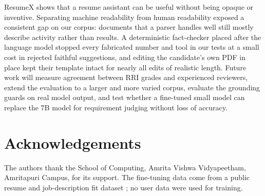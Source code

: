 \documentclass[3p,times,procedia]{elsarticle}
\begin{document}
ResumeX shows that a resume assistant can be useful without being opaque or inventive. Separating machine readability from human readability exposed a consistent gap on our corpus: documents that a parser handles well still mostly describe activity rather than results. A deterministic fact-checker placed after the language model stopped every fabricated number and tool in our tests at a small cost in rejected faithful suggestions, and editing the candidate's own PDF in place kept their template intact for nearly all edits of realistic length. Future work will measure agreement between RRI grades and experienced reviewers, extend the evaluation to a larger and more varied corpus, evaluate the grounding guards on real model output, and test whether a fine-tuned small model can replace the 7B model for requirement judging without loss of accuracy.

\section*{Acknowledgements}

The authors thank the School of Computing, Amrita Vishwa Vidyapeetham, Amritapuri Campus, for its support. The fine-tuning data come from a public resume and job-description fit dataset \cite{resumefit}; no user data were used for training.
\end{document}
